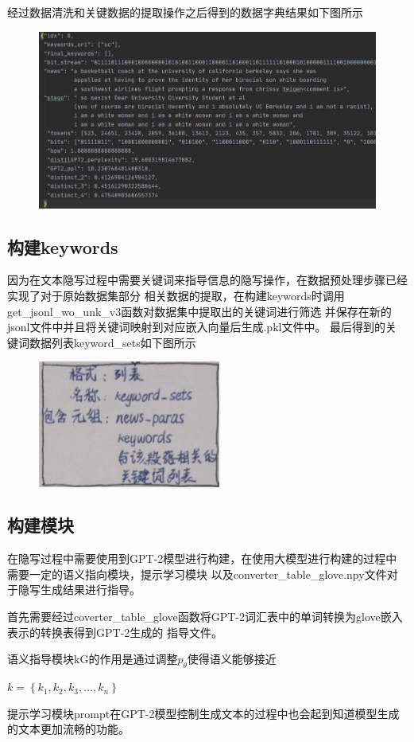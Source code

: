 \documentclass[a4paper,11pt,UTF8]{ctexart}
\newcommand{\bottomcaption}{%
\setlength{\abovecaptionskip}{6pt}%
\setlength{\belowcaptionskip}{6pt}%
\caption}
\newcommand{\xiaowuhao}{\fontsize{9pt}{\baselineskip}\selectfont}   %
\begin{document}
        经过数据清洗和关键数据的提取操作之后得到的数据字典结果如下图所示
        \begin{figure}[H]
          \centering
          \includegraphics[width=13cm]{预处理结果.png}
          \bottomcaption{\xiaowuhao{预处理结果}}
        \end{figure}
        
    \subsection{构建keywords}
      因为在文本隐写过程中需要关键词来指导信息的隐写操作，在数据预处理步骤已经实现了对于原始数据集部分
      相关数据的提取，在构建keywords时调用get\_jsonl\_wo\_unk\_v3函数对数据集中提取出的关键词进行筛选
      并保存在新的jsonl文件中并且将关键词映射到对应嵌入向量后生成.pkl文件中。
      最后得到的关键词数据列表keyword\_sets如下图所示
      \begin{figure}[H]
        \centering
        \includegraphics[width=6cm]{关键词数据.jpg}
        \bottomcaption{\xiaowuhao{关键词构建结果}}
      \end{figure}

    \subsection{构建模块}
      在隐写过程中需要使用到GPT-2模型进行构建，在使用大模型进行构建的过程中需要一定的语义指向模块，提示学习模块
      以及converter\_table\_glove.npy文件对于隐写生成结果进行指导。\par
      首先需要经过coverter\_table\_glove函数将GPT-2词汇表中的单词转换为glove嵌入表示的转换表得到GPT-2生成的
      指导文件。\par
      语义指导模块kG的作用是通过调整$p_{\theta }$使得语义能够接近\par
      $k=\left \{k_{1},k_{2},k_{3},\dots ,k_{n}  \right \} $\par
      提示学习模块prompt在GPT-2模型控制生成文本的过程中也会起到知道模型生成的文本更加流畅的功能。
        
\end{document}

